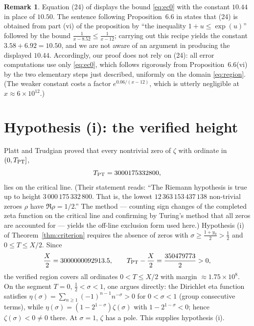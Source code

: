 \documentclass[11pt]{article}
\theoremstyle{definition}
\newtheorem{remark}[theorem]{Remark}
\begin{document}
\begin{remark}\label{rem:1044}
Equation (24) of \cite{Polymath} displays the bound \eqref{eq:ec0}
with the constant $10.44$ in place of $10.50$. The sentence following
Proposition~6.6 in \cite{Polymath} states that (24) is obtained from
part (vi) of the proposition by ``the inequality $1+u\le\exp(u)$''
followed by the bound $\frac{1}{x-8.52}\le\frac{1}{x-12}$; carrying
out this recipe yields the constant $3.58+6.92=10.50$, and we are not
aware of an argument in \cite{Polymath} producing the displayed
$10.44$. Accordingly, our proof does not rely on (24): all error
computations use only
\eqref{eq:ec0}, which follows rigorously from Proposition~6.6(vi) by
the two elementary steps just described, uniformly on the domain
\eqref{eq:region}. (The weaker constant costs a factor
$e^{0.06/(x-12)}$, which is utterly negligible at
$x\approx6\times10^{12}$.)
\end{remark}

\section{Hypothesis (i): the verified height}\label{sec:hypi}

Platt and Trudgian \cite[Theorem~1]{PlattTrudgian} proved that every
nontrivial zero of $\zeta$ with ordinate in $(0,T_{\rm PT}]$,
\[
T_{\rm PT}=3000175332800,
\]
lies on the critical line. (Their statement reads: ``The Riemann
hypothesis is true up to height $3\,000\,175\,332\,800$. That is, the
lowest $12\,363\,153\,437\,138$ non-trivial zeroes $\rho$ have
$\Re\rho=1/2$.'' The method --- counting sign changes of the completed
zeta function on the critical line and confirming by Turing's method
that all zeros are accounted for --- yields the off-line exclusion
form used here.) Hypothesis (i) of
Theorem~\ref{thm:criterion} requires the absence of zeros with
$\sigma\ge\frac{1+y_0}2>\frac12$ and $0\le T\le X/2$. Since
\[
\frac X2=3000000092913.5,
\qquad
T_{\rm PT}-\frac X2=\frac{350479773}{2}>0,
\]
the verified region covers all ordinates $0<T\le X/2$ with margin
$\approx1.75\times10^8$. On the segment $T=0$, $\tfrac12<\sigma<1$,
one argues directly: the Dirichlet eta function satisfies
$\eta(\sigma)=\sum_{n\ge1}(-1)^{n-1}n^{-\sigma}>0$ for
$0<\sigma<1$ (group consecutive terms), while
$\eta(\sigma)=(1-2^{1-\sigma})\zeta(\sigma)$ with
$1-2^{1-\sigma}<0$; hence $\zeta(\sigma)<0\ne0$ there. At $\sigma=1$,
$\zeta$ has a pole. This supplies hypothesis (i).
\end{document}
